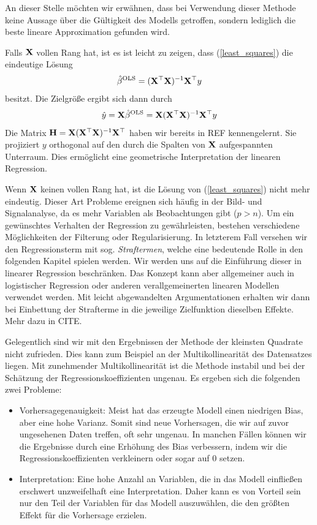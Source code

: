 An dieser Stelle möchten wir erwähnen, dass bei Verwendung dieser Methode keine Aussage über die Gültigkeit des Modells getroffen, sondern lediglich die beste lineare Approximation gefunden wird.

Falls $\mathbf{X}$ vollen Rang hat, ist es ist leicht zu zeigen, dass (\ref{least_squares}) die eindeutige Lösung
\begin{align}
\hat{\beta}^{\text{OLS}} = (\mathbf{X}^{\top}\mathbf{X})^{-1}\mathbf{X}^{\top} y
\end{align}
besitzt. Die Zielgröße ergibt sich dann durch
\begin{align}
\hat{y} = \mathbf{X} \hat{\beta}^{\text{OLS}} = \mathbf{X} (\mathbf{X}^{\top}\mathbf{X})^{-1}\mathbf{X}^{\top} y
\end{align}
Die Matrix $\mathbf{H} = \mathbf{X} (\mathbf{X}^{\top}\mathbf{X})^{-1}\mathbf{X}^{\top}$ haben wir bereits in REF kennengelernt. Sie projiziert $y$ orthogonal auf den durch  die Spalten von $\mathbf{X}$ aufgespannten Unterraum. Dies ermöglicht eine geometrische Interpretation der linearen Regression.

Wenn $\mathbf{X}$ keinen vollen Rang hat, ist die Lösung von (\ref{least_squares}) nicht mehr eindeutig. Dieser Art Probleme ereignen sich häufig in der Bild- und Signalanalyse, da es mehr Variablen als Beobachtungen gibt ($p > n$). Um ein gewünschtes Verhalten der Regression zu gewährleisten, bestehen verschiedene Möglichkeiten der Filterung oder Regularisierung. In letzterem Fall versehen wir den Regressionsterm mit sog. \textit{Straftermen}, welche eine bedeutende Rolle in den folgenden Kapitel spielen werden. Wir werden uns auf die Einführung dieser in linearer Regression beschränken. Das Konzept kann aber allgemeiner auch in logistischer Regression oder anderen verallgemeinerten linearen Modellen verwendet werden. Mit leicht abgewandelten Argumentationen erhalten wir dann bei Einbettung der Strafterme in die jeweilige Zielfunktion dieselben Effekte. Mehr dazu in CITE.

Gelegentlich sind wir mit den Ergebnissen der Methode der kleinsten Quadrate nicht zufrieden. Dies kann zum Beispiel an der Multikollinearität des Datensatzes liegen. Mit zunehmender Multikollinearität ist die Methode instabil und bei der Schätzung der Regressionskoeffizienten ungenau. Es ergeben sich die folgenden zwei Probleme:
\begin{itemize}
\item Vorhersagegenauigkeit: Meist hat das erzeugte Modell einen niedrigen Bias, aber eine hohe Varianz. Somit sind neue Vorhersagen, die wir auf zuvor ungesehenen Daten treffen, oft sehr ungenau. In manchen Fällen können wir die Ergebnisse durch eine Erhöhung des Bias verbessern, indem wir die Regressionskoeffizienten verkleinern oder sogar auf 0 setzen.
\item Interpretation: Eine hohe Anzahl an Variablen, die in das Modell einfließen erschwert unzweifelhaft eine Interpretation. Daher kann es von Vorteil sein nur den Teil der Variablen für das Modell auszuwählen, die den größten Effekt für die Vorhersage erzielen.
\end{itemize}

